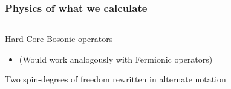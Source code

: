 \begin{frame}
    \frametitle{Physics of what we calculate}

    \begin{columns}
            \begin{wideitemize}
                \item Hard-Core Bosonic operators
                \begin{itemize}
                    \item (Would work analogously with Fermionic operators)
                \end{itemize}
                \item Two spin-degrees of freedom rewritten in alternate notation
            \end{wideitemize}

            
    \end{columns}
\end{frame}